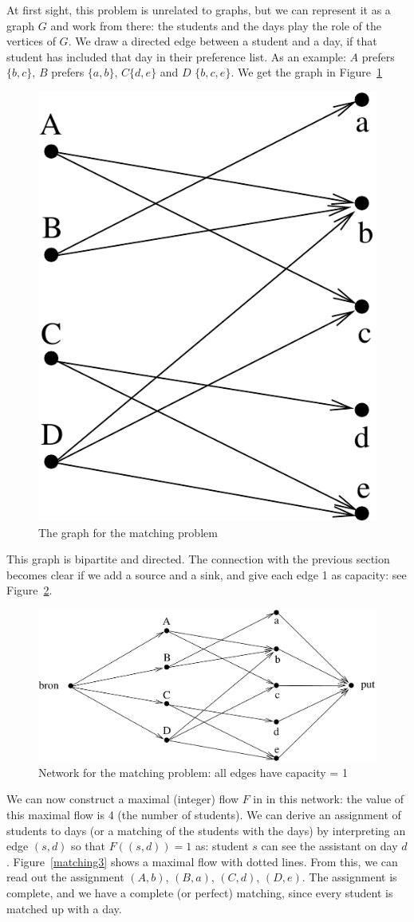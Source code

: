 At first sight, this problem is unrelated to graphs, but we can
represent it as a graph $G$ and work from there: the students and the
days play the role of the vertices of $G$. We draw a directed edge
between a student and a day, if that student has included that day in
their preference list. As an example: $A$ prefers $\{b,c\}$, $B$
prefers $\{a,b\}$, $C \{d,e\}$ and $D$ $\{b,c,e\}$. We get the graph
in Figure~\ref{matching1}

\begin{figure}[ht]
\begin{center}
\includegraphics[width=0.17\linewidth,keepaspectratio]{matching1} %
\end{center}
\caption{The graph for the matching problem\label{matching1}}
\end{figure}

This graph is bipartite and directed. The connection with the previous
section becomes clear if we add a source and a sink, and give each
edge 1 as capacity: see Figure~\ref{matching2}.

\begin{figure}[ht]
\begin{center}
\includegraphics[width=0.5\linewidth,keepaspectratio]{matching2} %
\end{center}
\caption{Network for the matching problem: all edges have capacity =
1\label{matching2}}
\end{figure}


We can now construct a maximal (integer) flow $F$ in in this network:
the value of this maximal flow is 4 (the number of students). We can
derive an assignment of students to days (or a matching of the
students with the days) by interpreting an edge $(s,d)$ so that
$F((s,d)) = 1$ as: student $s$ can see the assistant on day
$d$. Figure~\ref{matching3} shows a maximal flow with dotted lines. From this, we
can read out the assignment $(A,b)$, $(B,a)$, $(C,d)$,
$(D,e)$. The assignment is complete, and we have a complete (or
perfect) matching, since every student is matched up with a day.

